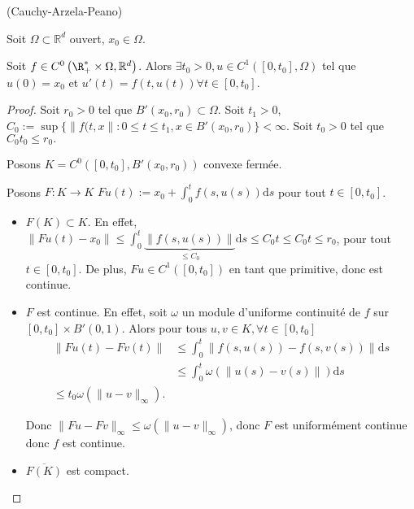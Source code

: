 \begin{theoreme}
	(Cauchy-Arzela-Peano)

	Soit $\Omega \subset \mathbb{R}^d $ ouvert, $x_0 \in  \Omega$.

	Soit $ f \in C^0\left( \R_+^* \times  \Omega, \mathbb{R}^d  \right) $. Alors $\exists  t_0 >0, u \in C^1\left( [0,t_0], \Omega \right) $ tel que $u\left( 0 \right) =x_0$ et $u'\left( t \right) = f\left( t, u\left( t \right)  \right) \forall t \in [0,t_0]$.
\end{theoreme}
\begin{proof}
	Soit $r_0 >0$ tel que $B'\left( x_0, r_0 \right) \subset \Omega$.
	Soit $t_1 >0$, $C_0 := \sup \{\|f(t,x\| : 0\le t\le t_1, x \in B'\left( x_0, r_0 \right) \} < \infty$.
	Soit $t_0 >0$ tel que $C_0 t_0 \le r_0.$

	Posons $K= C^0\left( [0,t_0], B'\left( x_0, r_0 \right)  \right) $ convexe fermée.

	Posons $F : K \to  K $ $Fu\left( t \right) := x_0  + \int_{0}^{t} f\left( s,u\left( s \right)  \right) \mathrm{d} s$  pour tout $t \in [0,t_0]$.
	\begin{itemize}
		\item $F\left( K \right) \subset K$. En effet, $\|Fu\left( t \right) -x_0\| \le \int_{0}^{t} \underbrace{\|f\left( s,u\left( s \right)  \right) \|}_{\le C_0} \mathrm{d} s \le C_0 t \le C_0t \le r_0$, pour tout $t\in [0, t_0]$.
			De plus, $Fu \in C^1\left( [0, t_0] \right) $ en tant que primitive, donc est continue.

		\item $F$ est continue.
			En effet, soit $\omega$ un module d'uniforme continuité de $f$ sur $[0,t_0] \times B'\left( 0,1 \right) $.
			Alors pour tous $u,v \in K, \forall t \in [0,t_0] \ $ 
			\begin{align*}
				\left\|Fu\left( t \right) - Fv\left( t \right) \right\| &\le \int_{0}^{t}  \|f(s,u\left( s \right) ) - f\left( s, v\left( s \right)  \right) \|   \mathrm{d} s\\
											&\le \int_{0}^{t} \omega\left( \| u\left( s \right) - v\left( s \right) \| \right) \mathrm{d} s\\
											\le t_0 \omega\left( \|u-v\|_{\infty} \right) 
			.\end{align*}

			Donc $\|Fu-Fv\|_{\infty}\le  \omega\left( \|u-v\|_{\infty} \right) $, donc $F$ est uniformément continue donc $f$ est continue.
		\item $\overline{F\left( K \right) }$ est compact.


\end{itemize}
\end{proof}
